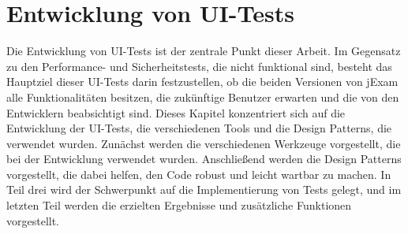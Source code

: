 \section{Entwicklung von UI-Tests}


Die Entwicklung von UI-Tests ist der zentrale Punkt dieser Arbeit.
Im Gegensatz zu den Performance- und Sicherheitstests, die nicht funktional sind,
besteht das Hauptziel dieser UI-Tests darin festzustellen, ob die beiden Versionen
von jExam alle Funktionalitäten besitzen, die zukünftige Benutzer erwarten und die von
den Entwicklern beabsichtigt sind.
Dieses Kapitel konzentriert sich auf die Entwicklung der UI-Tests, die
verschiedenen Tools und die Design Patterns, die verwendet wurden. Zunächst
werden die verschiedenen Werkzeuge vorgestellt, die bei der Entwicklung
verwendet wurden. Anschließend werden die Design Patterns vorgestellt, die
dabei helfen, den Code robust und leicht wartbar zu machen. In Teil drei
wird der Schwerpunkt auf die Implementierung von Tests gelegt, und im letzten
Teil werden die erzielten Ergebnisse und zusätzliche Funktionen vorgestellt.





